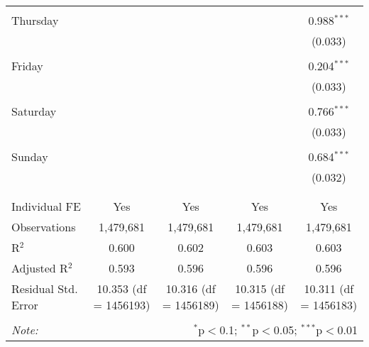 \documentclass[
]{article}
\begin{document}
\begin{table}[!htbp]
{\begin{tabular}{@{\extracolsep{5pt}}lcccc}
  & & & & \\ 
 Thursday &  &  &  & 0.988$^{***}$ \\ 
  &  &  &  & (0.033) \\ 
  & & & & \\ 
 Friday &  &  &  & 0.204$^{***}$ \\ 
  &  &  &  & (0.033) \\ 
  & & & & \\ 
 Saturday &  &  &  & 0.766$^{***}$ \\ 
  &  &  &  & (0.033) \\ 
  & & & & \\ 
 Sunday &  &  &  & 0.684$^{***}$ \\ 
  &  &  &  & (0.032) \\ 
  & & & & \\ 
\hline \\[-1.8ex] 
Individual FE & Yes & Yes & Yes & Yes \\ 
Observations & 1,479,681 & 1,479,681 & 1,479,681 & 1,479,681 \\ 
R$^{2}$ & 0.600 & 0.602 & 0.603 & 0.603 \\ 
Adjusted R$^{2}$ & 0.593 & 0.596 & 0.596 & 0.596 \\ 
Residual Std. Error & 10.353 (df = 1456193) & 10.316 (df = 1456189) & 10.315 (df = 1456188) & 10.311 (df = 1456183) \\ 
\hline 
\hline \\[-1.8ex] 
\textit{Note:}  & \multicolumn{4}{r}{$^{*}$p$<$0.1; $^{**}$p$<$0.05; $^{***}$p$<$0.01} \\ 
\end{tabular}
} 
\end{table} 
\newpage
\end{document}
